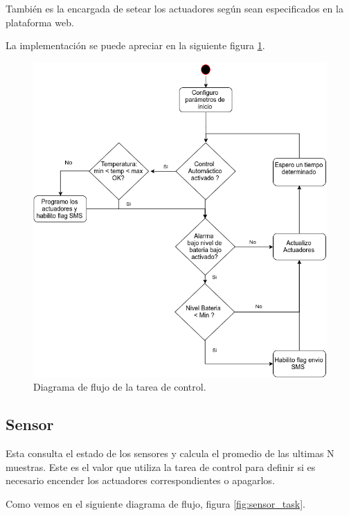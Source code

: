 También es la encargada de setear los actuadores según sean especificados en la plataforma web.

La implementación se puede apreciar en la siguiente figura \ref{fig:control_task}.

\begin{figure}[!hp]
  \centering
  \includegraphics[scale=.5]{./Figures/control_task.png}
  \caption{Diagrama de flujo de la tarea de control.}
  \label{fig:control_task}
\end{figure}


\subsection*{Sensor}
 Esta consulta el estado de los sensores y calcula el promedio de las ultimas N muestras. Este es el valor que utiliza la tarea de control para definir si es necesario encender los actuadores correspondientes o apagarlos.

 Como vemos en el siguiente diagrama de flujo, figura \ref{fig:sensor_task}.

